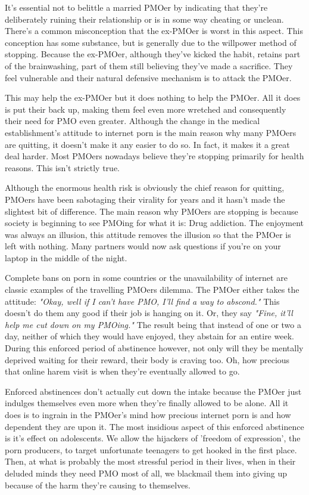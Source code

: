 \documentclass[easypeasy.tex]{subfiles}
\begin{document}
It's essential not to belittle a married PMOer by indicating that they're deliberately ruining their relationship or is in some way cheating or unclean. There's a common misconception that the ex-PMOer is worst in this aspect. This conception has some substance, but is generally due to the willpower method of stopping. Because the ex-PMOer, although they've kicked the habit, retains part of the brainwashing, part of them still believing they've made a sacrifice. They feel vulnerable and their natural defensive mechanism is to attack the PMOer.

This may help the ex-PMOer but it does nothing to help the PMOer. All it does is put their back up, making them feel even more wretched and consequently their need for PMO even greater. Although the change in the medical establishment's attitude to internet porn is the main reason why many PMOers are quitting, it doesn't make it any easier to do so. In fact, it makes it a great deal harder. Most PMOers nowadays believe they're stopping primarily for health reasons. This isn't strictly true.

Although the enormous health risk is obviously the chief reason for quitting, PMOers have been sabotaging their virality for years and it hasn't made the slightest bit of difference. The main reason why PMOers are stopping is because society is beginning to see PMOing for what it is: Drug addiction. The enjoyment was always an illusion, this attitude removes the illusion so that the PMOer is left with nothing. Many partners would now ask questions if you're on your laptop in the middle of the night.

Complete bans on porn in some countries or the unavailability of internet are classic examples of the travelling PMOers dilemma. The PMOer either takes the attitude: \textit{"Okay, well if I can't have PMO, I'll find a way to abscond."} This doesn't do them any good if their job is hanging on it. Or, they say \textit{"Fine, it'll help me cut down on my PMOing."} The result being that instead of one or two a day, neither of which they would have enjoyed, they abstain for an entire week. During this enforced period of abstinence however, not only will they be mentally deprived waiting for their reward, their body is craving too. Oh, how precious that online harem visit is when they're eventually allowed to go.

Enforced abstinences don't actually cut down the intake because the PMOer just indulges themselves even more when they're finally allowed to be alone. All it does is to ingrain in the PMOer's mind how precious internet porn is and how dependent they are upon it. The most insidious aspect of this enforced abstinence is it's effect on adolescents. We allow the hijackers of 'freedom of expression', the porn producers, to target unfortunate teenagers to get hooked in the first place. Then, at what is probably the most stressful period in their lives, when in their deluded minds they need PMO most of all, we blackmail them into giving up because of the harm they're causing to themselves.
\end{document}
